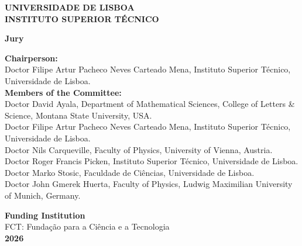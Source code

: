 \begin{titlepage}
  \thispagestyle{empty}

  \noindent\parbox[c][2.0cm][c]{\textwidth}{\istthesislogo}
  \begin{center}
    \textbf{UNIVERSIDADE DE LISBOA\\[0.15cm]
    INSTITUTO SUPERIOR TÉCNICO}
    \vspace{0.4cm}

    \istthesistitle
    \vspace{0.4cm}
    \istthesisauthor
  \end{center}
  \vspace{0.45cm}
  \istthesissupervisors
  \vspace{0.35cm}
  \istthesisapproval
  \vspace{0.35cm}
  \begin{center}{\large\bfseries Jury}\end{center}
  \begin{flushleft}
    \footnotesize
    \textbf{Chairperson:}\\
    Doctor Filipe Artur Pacheco Neves Carteado Mena, Instituto Superior Técnico, Universidade de Lisboa.\\[0.25cm]
    \textbf{Members of the Committee:}\\
    Doctor David Ayala, Department of Mathematical Sciences, College of Letters \& Science, Montana State University, USA.\\[0.12cm]
    Doctor Filipe Artur Pacheco Neves Carteado Mena, Instituto Superior Técnico, Universidade de Lisboa.\\[0.12cm]
    Doctor Nils Carqueville, Faculty of Physics, University of Vienna, Austria.\\[0.12cm]
    Doctor Roger Francis Picken, Instituto Superior Técnico, Universidade de Lisboa.\\[0.12cm]
    Doctor Marko Stosic, Faculdade de Ciências, Universidade de Lisboa.\\[0.12cm]
    Doctor John Gmerek Huerta, Faculty of Physics, Ludwig Maximilian University of Munich, Germany.
  \end{flushleft}
  \vfill
  \begin{center}
    \textbf{Funding Institution}\\[0.15cm]
    FCT: Fundação para a Ciência e a Tecnologia\\[0.35cm]
    \textbf{2026}
  \end{center}
\end{titlepage}
